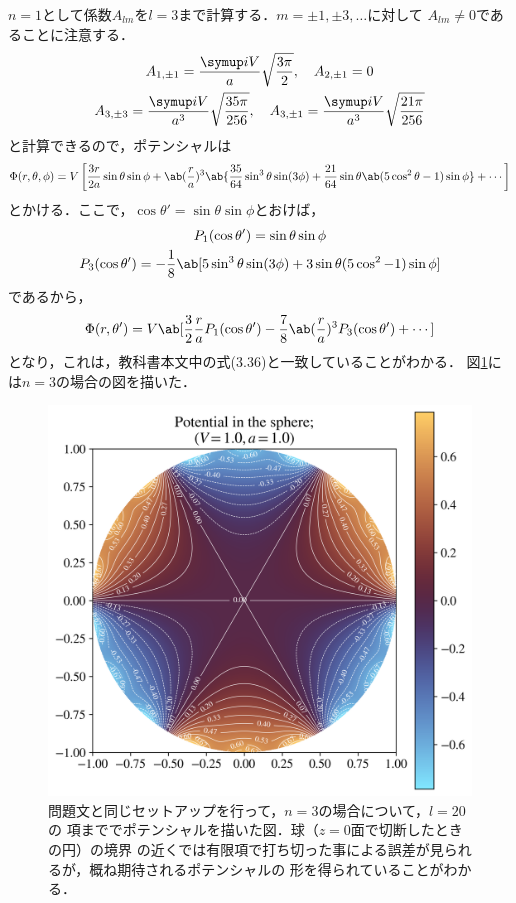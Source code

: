   $n = 1$として係数$A_{lm}$を$l = 3$まで計算する．$m = \pm 1, \pm 3, \ldots$に対して
  $A_{lm} \neq 0$であることに注意する．
  \begin{gather*}%
    A_{1,\pm 1} = \frac{\i V}{a}\sqrt{\frac{3\pi}{2}},\qq
    A_{2,\pm 1} = 0\\
    A_{3,\pm 3} = \frac{\i V}{a^3} \sqrt{\frac{35\pi}{256}},\qq
    A_{3,\pm 1} = \frac{\i V}{a^3} \sqrt{\frac{21\pi}{256}}
  \end{gather*}%
  と計算できるので，ポテンシャルは
  \begin{gather}%
    \Phi(r,\theta,\phi) = V\left[
      \frac{3r}{2a} \sin\theta\sin\phi
      +
      \ab(\frac{r}{a})^3\ab\{
        \frac{35}{64}\sin^3\theta\sin(3\phi) + 
        \frac{21}{64}\sin\theta\ab(5\cos^2\theta-1)\sin\phi
      \} + \cdots
      \right]
  \end{gather}%
  とかける．ここで，$\cos\theta' = \sin\theta \sin\phi$とおけば，
  \begin{gather}%
    P_1(\cos\theta') = \sin\theta\sin\phi\\
    P_3(\cos\theta') = -\frac{1}{8}\ab[5\sin^3\theta\sin(3\phi) 
    + 3\sin\theta(5\cos^2-1)\sin\phi]
  \end{gather}%
  であるから，
  \begin{gather}%
    \Phi(r,\theta') = V\ab[\frac{3}{2} \frac ra P_1(\cos\theta') - 
    \frac{7}{8}\ab(\frac ra)^3P_3(\cos\theta') + \cdots]
  \end{gather}%
  となり，これは，教科書本文中の式(3.36)と一致していることがわかる．
  図\ref{fig:3-4_n3}には$n = 3$の場合の図を描いた．
  \begin{figure}[htbp]%
    \centering%
    \includegraphics[width=0.5\linewidth]{py/3-4_n3.png}%
    \caption{問題文と同じセットアップを行って，$n = 3$の場合について，$l = 20$の
    項まででポテンシャルを描いた図．球（$z = 0$面で切断したときの円）の境界
    の近くでは有限項で打ち切った事による誤差が見られるが，概ね期待されるポテンシャルの
    形を得られていることがわかる．}%
    \label{fig:3-4_n3}%
  \end{figure}%

  \clearpage
